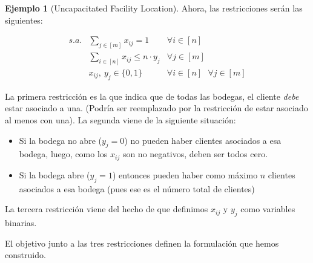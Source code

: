 \documentclass[10pt]{article}
\theoremstyle{plain}
\theoremstyle{definition}
\newtheorem{eje}{Ejemplo}
\begin{document}
\begin{eje}[Uncapacitated Facility Location]
Ahora, las restricciones serán las siguientes:

\begin{equation*}
    \begin{array}{rll}
        s.a.&\sum\limits_{j\in[m]}x_{ij}=1&\forall i \in [n]\\
        &\sum\limits_{i\in [n]}x_{ij}\leq n\cdot y_j&\forall j \in [m]\\
        &x_{ij},\ y_{j}\in\{0,1\}&\forall i\in[n]\text{ }\forall j\in[m]
    \end{array}
\end{equation*}

La primera restricción es la que indica que de todas las bodegas, el cliente \emph{debe} estar asociado a una. (Podría ser reemplazado por la restricción de estar asociado al menos con una). La segunda viene de la siguiente situación:
\begin{itemize}
    \item Si la bodega no abre ($y_j=0$) no pueden haber clientes asociados a esa bodega, luego, como los $x_{ij}$ son no negativos, deben ser todos cero.
    \item Si la bodega abre ($y_j=1$) entonces pueden haber como máximo $n$ clientes asociados a esa bodega (pues ese es el número total de clientes)
\end{itemize}
La tercera restricción viene del hecho de que definimos $x_{ij}$ y $y_j$ como variables binarias. 

El objetivo junto a las tres restricciones definen la formulación que hemos construido.
\end{eje}
\end{document}
